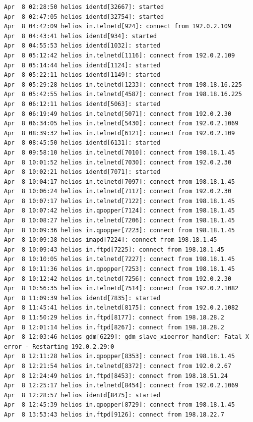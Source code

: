 \begin{lstlisting}[style=terminal]
Apr  8 02:28:50 helios identd[32667]: started
Apr  8 02:47:05 helios identd[32754]: started
Apr  8 04:42:09 helios in.telnetd[924]: connect from 192.0.2.109
Apr  8 04:43:41 helios identd[934]: started
Apr  8 04:55:53 helios identd[1032]: started
Apr  8 05:12:42 helios in.telnetd[1116]: connect from 192.0.2.109
Apr  8 05:14:44 helios identd[1124]: started
Apr  8 05:22:11 helios identd[1149]: started
Apr  8 05:29:28 helios in.telnetd[1233]: connect from 198.18.16.225
Apr  8 05:42:55 helios in.telnetd[4587]: connect from 198.18.16.225
Apr  8 06:12:11 helios identd[5063]: started
Apr  8 06:19:49 helios in.telnetd[5071]: connect from 192.0.2.30
Apr  8 06:34:05 helios in.telnetd[5430]: connect from 192.0.2.1069
Apr  8 08:39:32 helios in.telnetd[6121]: connect from 192.0.2.109
Apr  8 08:45:50 helios identd[6131]: started
Apr  8 09:58:10 helios in.telnetd[7010]: connect from 198.18.1.45
Apr  8 10:01:52 helios in.telnetd[7030]: connect from 192.0.2.30
Apr  8 10:02:21 helios identd[7071]: started
Apr  8 10:04:17 helios in.telnetd[7097]: connect from 198.18.1.45
Apr  8 10:06:24 helios in.telnetd[7117]: connect from 192.0.2.30
Apr  8 10:07:17 helios in.telnetd[7122]: connect from 198.18.1.45
Apr  8 10:07:42 helios in.qpopper[7124]: connect from 198.18.1.45
Apr  8 10:08:27 helios in.telnetd[7206]: connect from 198.18.1.45
Apr  8 10:09:36 helios in.qpopper[7223]: connect from 198.18.1.45
Apr  8 10:09:38 helios imapd[7224]: connect from 198.18.1.45
Apr  8 10:09:43 helios in.ftpd[7225]: connect from 198.18.1.45
Apr  8 10:10:05 helios in.telnetd[7227]: connect from 198.18.1.45
Apr  8 10:11:36 helios in.qpopper[7253]: connect from 198.18.1.45
Apr  8 10:12:42 helios in.telnetd[7256]: connect from 192.0.2.30
Apr  8 10:56:35 helios in.telnetd[7514]: connect from 192.0.2.1082
Apr  8 11:09:39 helios identd[7835]: started
Apr  8 11:45:41 helios in.telnetd[8175]: connect from 192.0.2.1082
Apr  8 11:50:29 helios in.ftpd[8177]: connect from 198.18.28.2
Apr  8 12:01:14 helios in.ftpd[8267]: connect from 198.18.28.2
Apr  8 12:03:46 helios gdm[6229]: gdm_slave_xioerror_handler: Fatal X error - Restarting 192.0.2.29:0
Apr  8 12:11:28 helios in.qpopper[8353]: connect from 198.18.1.45
Apr  8 12:21:54 helios in.telnetd[8372]: connect from 192.0.2.67
Apr  8 12:24:49 helios in.ftpd[8453]: connect from 198.18.51.24
Apr  8 12:25:17 helios in.telnetd[8454]: connect from 192.0.2.1069
Apr  8 12:28:57 helios identd[8475]: started
Apr  8 12:45:39 helios in.qpopper[8729]: connect from 198.18.1.45
Apr  8 13:53:43 helios in.ftpd[9126]: connect from 198.18.22.7

\end{lstlisting}
